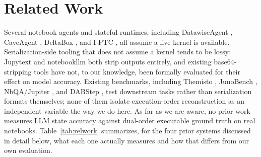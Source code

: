 \documentclass[11pt]{article}
\begin{document}
\section{Related Work}
\label{sec:relwork}
Several notebook agents and stateful runtimes, including DatawiseAgent
\citep{you2025datawise}, CaveAgent \citep{ran2026caveagent}, DeltaBox
\citep{dong2026deltabox}, and I-PTC \citep{gonzalez2026}, all assume a
live kernel is available. Serialization-side tooling that does not
assume a kernel tends to be lossy: Jupytext \citep{jupytext} and
notebookllm \citep{notebookllm} both strip outputs entirely, and existing
base64-stripping tools have not, to our knowledge, been formally
evaluated for their effect on model accuracy. Existing benchmarks,
including Themisto \citep{grotov2025themisto}, JunoBench
\citep{wang2025junobench}, NbQA/Jupiter \citep{li2025jupiter}, and
DABStep \citep{egg2025dabstep}, test downstream tasks rather than
serialization formats themselves; none of them isolate execution-order
reconstruction as an independent variable the way we do here. As far as
we are aware, no prior work measures LLM state accuracy against
dual-order executable ground truth on real notebooks. Table~\ref{tab:relwork}
summarizes, for the four prior systems discussed in detail below, what
each one actually measures and how that differs from our own evaluation.
\end{document}
